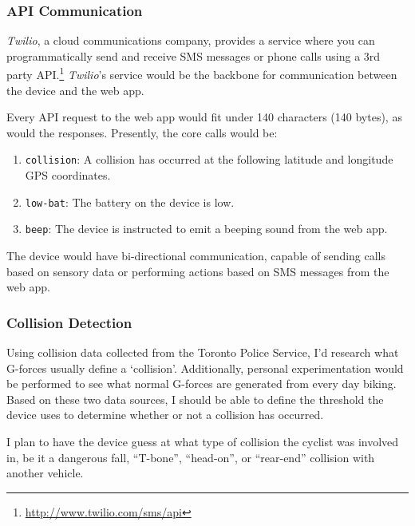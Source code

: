 \documentclass[titlepage]{article}
\begin{document}
\subsubsection{API Communication}
{\em Twilio}, a cloud communications company, provides a service where you can programmatically send and receive SMS messages or phone calls using a 3rd party API.\footnote{\url{http://www.twilio.com/sms/api}} {\em Twilio}'s service would be the backbone for communication between the device and the web app.

Every API request to the web app would fit under 140 characters (140 bytes), as would the responses. Presently, the core calls would be:

\begin{enumerate}
	\item {\tt collision}: A collision has occurred at the following latitude and longitude GPS coordinates.
	\item {\tt low-bat}: The battery on the device is low.
	\item {\tt beep}: The device is instructed to emit a beeping sound from the web app.
\end{enumerate}

The device would have bi-directional communication, capable of sending calls based on sensory data or performing actions based on SMS messages from the web app.

\subsubsection{Collision Detection}
Using collision data collected from the Toronto Police Service, I'd research what G-forces usually define a `collision'. Additionally, personal experimentation would be performed to see what normal G-forces are generated from every day biking. Based on these two data sources, I should be able to define the threshold the device uses to determine whether or not a collision has occurred.

I plan to have the device guess at what type of collision the cyclist was involved in, be it a dangerous fall, ``T-bone'', ``head-on'', or ``rear-end'' collision with another vehicle.
\end{document}
